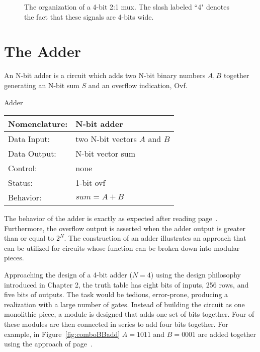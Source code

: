     \begin{figure}[ht]
        \caption{The organization of a 4-bit 2:1 mux.  The slash labeled ``4"
        denotes the fact that these signals are 4-bits wide.}
        \label{fig:comboBB4x2x1mux}
    \end{figure}

\section{The Adder}
An N-bit adder is a circuit which adds two N-bit binary numbers
$A,B$ together generating an N-bit sum $S$ and an overflow
indication, Ovf.

\begin{buildingblock}{Adder}
    \label{buildingblock:adder}
        \begin{tabular}{|l|p{3.5in}|} \hline
            Nomenclature:  & N-bit adder                \\ \hline
            Data Input:    & two N-bit vectors $A$ and $B$        \\ \hline
            Data Output:   & N-bit vector sum            \\ \hline
            Control:       & none                    \\ \hline
            Status:        & 1-bit ovf                 \\ \hline
            Behavior:      & $sum = A+B$                \\ \hline
        \end{tabular}
    \end{buildingblock}

    The behavior of the adder is exactly as expected after reading
    page~\pageref{page:addition}.  Furthermore, the overflow output is asserted
    when the adder output is greater than or equal to $2^N$.  The construction
    of an adder illustrates an approach that can be utilized for circuits
    whose function can be broken down into modular pieces.

    Approaching the design of a 4-bit adder ($N=4$) using the design
    philosophy introduced in Chapter 2, the truth table has eight bits
    of inputs, 256 rows, and five bits of outputs.  The task would be tedious,
    error-prone, producing a realization with a large number of
    gates.  Instead of building the circuit as one monolithic piece, a module
    is designed that adds one set of bits together.  Four of these modules are
    then connected in series to add four bits together.
    For example, in Figure~\ref{fig:comboBBadd} $A=1011$ and $B=0001$ are added
    together using the approach of page~\pageref{page:addition}.


